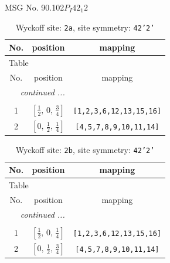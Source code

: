 \documentclass[fleqn,8pt]{jsarticle}
\begin{document}
\setcounter{MaxMatrixCols}{32}

\renewcommand{\tablename}{Table~}
\renewcommand{\figurename}{Figure~}
\begin{center}
\LARGE
MSG No. 90.102\quad$P_{I}42_{1}2$
\end{center}
\renewcommand{\arraystretch}{1.2}
\begin{longtable}{ccc}
\caption{Wyckoff site: {\tt 2a}, site symmetry: {\tt 42'2'}}
 \\
 \hline \hline
No. & position & mapping \\ \hline \endfirsthead

\multicolumn{2}{l}{\tablename\ \thetable{}} \\
 \hline \hline
No. & position & mapping \\ \hline \endhead

 \hline \hline
\multicolumn{2}{r}{\footnotesize\it continued ...} \\ \endfoot

 \hline \hline
\multicolumn{2}{r}{} \\ \endlastfoot

1 & $\left[ \frac{1}{2},\, 0,\, \frac{3}{4} \right]$ & {\tt [1,2,3,6,12,13,15,16]} \\ \hline
2 & $\left[ 0,\, \frac{1}{2},\, \frac{1}{4} \right]$ & {\tt [4,5,7,8,9,10,11,14]} \\
\end{longtable}
\renewcommand{\arraystretch}{1.2}
\begin{longtable}{ccc}
\caption{Wyckoff site: {\tt 2b}, site symmetry: {\tt 42'2'}}
 \\
 \hline \hline
No. & position & mapping \\ \hline \endfirsthead

\multicolumn{2}{l}{\tablename\ \thetable{}} \\
 \hline \hline
No. & position & mapping \\ \hline \endhead

 \hline \hline
\multicolumn{2}{r}{\footnotesize\it continued ...} \\ \endfoot

 \hline \hline
\multicolumn{2}{r}{} \\ \endlastfoot

1 & $\left[ \frac{1}{2},\, 0,\, \frac{1}{4} \right]$ & {\tt [1,2,3,6,12,13,15,16]} \\ \hline
2 & $\left[ 0,\, \frac{1}{2},\, \frac{3}{4} \right]$ & {\tt [4,5,7,8,9,10,11,14]} \\
\end{longtable}
\end{document}
